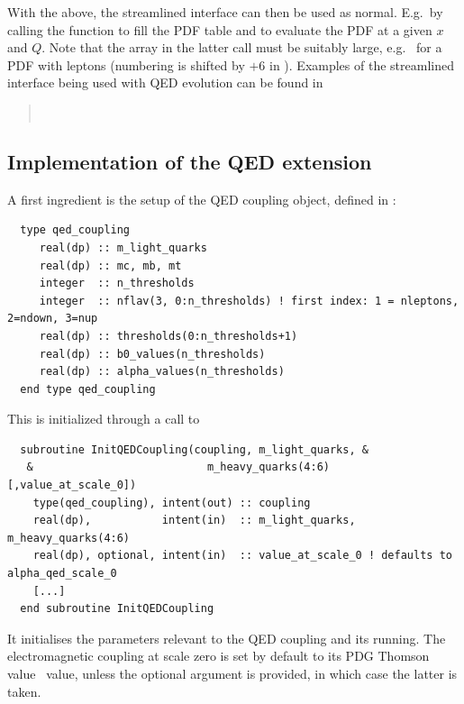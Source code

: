 With the above, the streamlined interface can then be used as normal.
%
E.g.\ by calling the  function to fill the PDF
table and  to evaluate the PDF at a given $x$
and $Q$.
%
Note that the  array in the latter call must be
suitably large, e.g.\  for a PDF with leptons (numbering
is shifted by $+6$ in \CPP).
%
Examples of the streamlined interface being used with QED evolution
can be found in
\begin{quote}
  \\
\end{quote}

\subsection{Implementation of the QED extension}
\label{sec:qed-implementation}


A first ingredient is the setup of the QED coupling object, defined in
:
\begin{lstlisting}
  type qed_coupling 
     real(dp) :: m_light_quarks
     real(dp) :: mc, mb, mt
     integer  :: n_thresholds
     integer  :: nflav(3, 0:n_thresholds) ! first index: 1 = nleptons, 2=ndown, 3=nup
     real(dp) :: thresholds(0:n_thresholds+1)
     real(dp) :: b0_values(n_thresholds)
     real(dp) :: alpha_values(n_thresholds)
  end type qed_coupling
\end{lstlisting}
%
This is initialized through a call to 
\begin{lstlisting}
  subroutine InitQEDCoupling(coupling, m_light_quarks, &
   &                           m_heavy_quarks(4:6) [,value_at_scale_0])
    type(qed_coupling), intent(out) :: coupling
    real(dp),           intent(in)  :: m_light_quarks, m_heavy_quarks(4:6)
    real(dp), optional, intent(in)  :: value_at_scale_0 ! defaults to alpha_qed_scale_0
    [...]
  end subroutine InitQEDCoupling
\end{lstlisting}
%
It initialises the parameters relevant to the QED coupling and its
running.  The electromagnetic coupling at scale zero is set by default
to its PDG Thomson value~\cite{ParticleDataGroup:2022pth} value, unless the optional
argument  is provided, in which case the
latter is taken.

